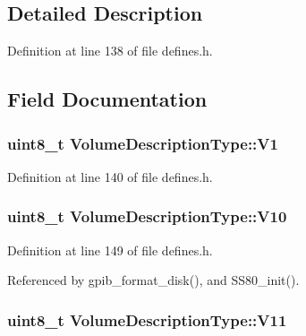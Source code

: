 \subsection{Detailed Description}


Definition at line 138 of file defines.\+h.



\subsection{Field Documentation}
\subsubsection[{\texorpdfstring{V1}{V1}}]{\setlength{\rightskip}{0pt plus 5cm}uint8\+\_\+t Volume\+Description\+Type\+::\+V1}\hypertarget{structVolumeDescriptionType_a179b7af780dd2a93dcb095d12690f6fa}{}\label{structVolumeDescriptionType_a179b7af780dd2a93dcb095d12690f6fa}


Definition at line 140 of file defines.\+h.

\subsubsection[{\texorpdfstring{V10}{V10}}]{\setlength{\rightskip}{0pt plus 5cm}uint8\+\_\+t Volume\+Description\+Type\+::\+V10}\hypertarget{structVolumeDescriptionType_ac75ed59ba452ed86278e43e6fc5adec1}{}\label{structVolumeDescriptionType_ac75ed59ba452ed86278e43e6fc5adec1}


Definition at line 149 of file defines.\+h.



Referenced by gpib\+\_\+format\+\_\+disk(), and S\+S80\+\_\+init().

\subsubsection[{\texorpdfstring{V11}{V11}}]{\setlength{\rightskip}{0pt plus 5cm}uint8\+\_\+t Volume\+Description\+Type\+::\+V11}\hypertarget{structVolumeDescriptionType_ad9ead8ed6e1eff85d9f1fde20c0ba60d}{}\label{structVolumeDescriptionType_ad9ead8ed6e1eff85d9f1fde20c0ba60d}


